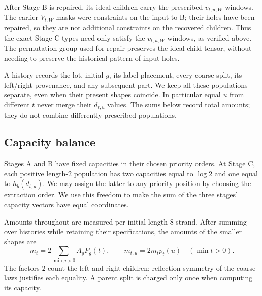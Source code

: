 After Stage B is repaired, its ideal children carry the prescribed
$v_{t,u,W}$ windows.  The earlier $V_{t,W}$ masks were constraints on
the input to B; their holes have been repaired, so they are not additional
constraints on the recovered children.  Thus the exact Stage C types
need only satisfy the $v_{t,u,W}$ windows, as verified above.  The
permutation group used for repair preserves the ideal child tensor,
without needing to preserve the historical pattern of input holes.

A history records the lot, initial $g$, its label placement, every
coarse split, its left/right provenance, and any subsequent part.
We keep all these populations separate, even when their present
shapes coincide.  In particular equal $u$ from different $t$ never
merge their $d_{t,u}$ values.  The sums below record total amounts;
they do not combine differently prescribed populations.

\subsection{Capacity balance}

Stages A and B have fixed capacities in their chosen priority orders.
At Stage C, each positive length-$2$ population has two capacities equal
to $\log2$ and one equal to $h_b(d_{t,u})$.  We may assign the latter
to any priority position by choosing the extraction order.  We use this
freedom to make the sum of the three stages' capacity vectors have equal
coordinates.

Amounts throughout are measured per initial length-$8$ strand.
After summing over histories while retaining their specifications,
the amounts of the smaller shapes are
\begin{equation}\label{eq:population-counts}
 m_t=2\sum_{\min g>0}A_gP_g(t),\qquad
 m_{t,u}=2m_t p_t(u)\quad(\min t>0).
\end{equation}
The factors $2$ count the left and right children; reflection symmetry
of the coarse laws justifies each equality.  A parent split is charged
only once when computing its capacity.


